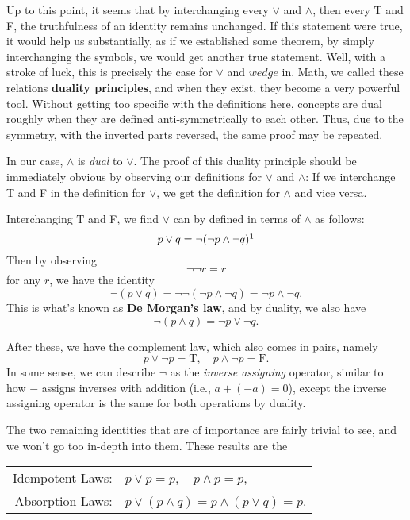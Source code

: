 Up to this point, it seems that by interchanging every $\vee$ and $\wedge$, then every T and F, the truthfulness of an identity remains unchanged.
If this statement were true, it would help us substantially, as if we established some theorem, by simply interchanging the symbols, we would get another true statement.
Well, with a stroke of luck, this is precisely the case for $\vee$ and $wedge$ in. Math, we called these relations \textbf{duality principles}, and when they exist, they become a very powerful tool.
Without getting too specific with the definitions here, concepts are dual roughly when they are defined anti-symmetrically to each other.
Thus, due to the symmetry, with the inverted parts reversed, the same proof may be repeated.

In our case, $\wedge$ is \textit{dual} to $\vee$.
The proof of this duality principle should be immediately obvious by observing our definitions for $\vee$ and $\wedge$:
If we interchange T and F in the definition for $\vee$, we get the definition for $\wedge$ and vice versa.

Interchanging T and F, we find $\vee$ can by defined in terms of $\wedge$ as follows:
$$p \vee q = \neg (\neg p \wedge \neg q)\footnotemark$$
Then by observing
$$\neg \neg r = r$$
for any $r$, we have the identity
$$\neg (p\vee q) = \neg \neg (\neg p \wedge \neg q)= \neg p \wedge \neg q.$$
This is what's known as \textbf{De Morgan's law}, and by duality, we also have
$$\neg (p\wedge q) =\neg p \vee \neg q.$$


After these, we have the complement law, which also comes in pairs, namely
$$p \vee \neg p = \text{T}, \quad p \wedge \neg p = \text{F}.$$
In some sense, we can describe $\neg$ as the \textit{inverse assigning} operator, similar to how $-$ assigns inverses with addition (i.e., $a+(-a)=0$), except the inverse assigning operator is the same for both operations by duality.

The two remaining identities that are of importance are fairly trivial to see, and we won't go too in-depth into them. These results are the
\begin{center}
	\begin{tabular}{rl}
	Idempotent Laws: & $p \vee p = p, \quad p \wedge p = p$, \\
	Absorption Laws: & $p \vee (p \wedge q) = p \wedge (p \vee q) = p$.
\end{tabular}
\end{center}


